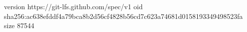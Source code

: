 version https://git-lfs.github.com/spec/v1
oid sha256:ac638efddf4a79bca8b2d56cf4828b56cd7c623a74681d0158193349498523fa
size 87544
